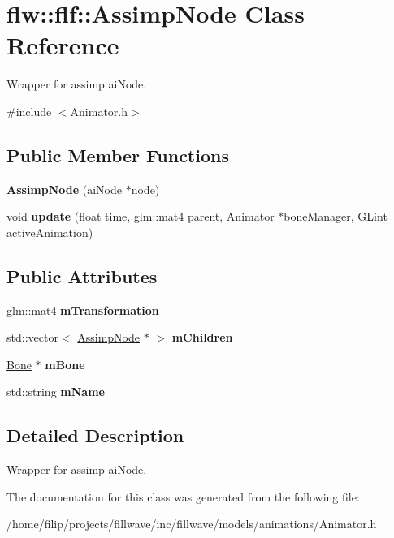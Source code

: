 \hypertarget{classflw_1_1flf_1_1AssimpNode}{}\section{flw\+:\+:flf\+:\+:Assimp\+Node Class Reference}
\label{classflw_1_1flf_1_1AssimpNode}


Wrapper for assimp ai\+Node.  




{\ttfamily \#include $<$Animator.\+h$>$}

\subsection*{Public Member Functions}
\begin{DoxyCompactItemize}
\item 
\mbox{\label{classflw_1_1flf_1_1AssimpNode_ad0adee9b1a17a63a9fb0c1e449d54552}} 
{\bfseries Assimp\+Node} (ai\+Node $\ast$node)
\item 
\mbox{\label{classflw_1_1flf_1_1AssimpNode_a75d8886e4fddb9bb210387181e9b0279}} 
void {\bfseries update} (float time, glm\+::mat4 parent, \hyperlink{classflw_1_1flf_1_1Animator}{Animator} $\ast$bone\+Manager, G\+Lint active\+Animation)
\end{DoxyCompactItemize}
\subsection*{Public Attributes}
\begin{DoxyCompactItemize}
\item 
\mbox{\label{classflw_1_1flf_1_1AssimpNode_a4ca78b6a9e1d3cd6bc6b026ad59dd299}} 
glm\+::mat4 {\bfseries m\+Transformation}
\item 
\mbox{\label{classflw_1_1flf_1_1AssimpNode_a22722cf413e1aba559c6014d320eceac}} 
std\+::vector$<$ \hyperlink{classflw_1_1flf_1_1AssimpNode}{Assimp\+Node} $\ast$ $>$ {\bfseries m\+Children}
\item 
\mbox{\label{classflw_1_1flf_1_1AssimpNode_aa97e88c3b82facef9b60f12699334d6a}} 
\hyperlink{classflw_1_1flf_1_1Bone}{Bone} $\ast$ {\bfseries m\+Bone}
\item 
\mbox{\label{classflw_1_1flf_1_1AssimpNode_ad846462ce02ceced39f7c84c778c6157}} 
std\+::string {\bfseries m\+Name}
\end{DoxyCompactItemize}


\subsection{Detailed Description}
Wrapper for assimp ai\+Node. 

The documentation for this class was generated from the following file\+:\begin{DoxyCompactItemize}
\item 
/home/filip/projects/fillwave/inc/fillwave/models/animations/Animator.\+h\end{DoxyCompactItemize}
